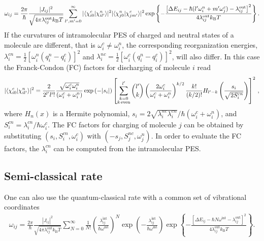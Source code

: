 \begin{align}
 \omega_{ij}= \frac{2\pi}{\hbar}  \frac{|J_{ij}|^2}{\sqrt{4\pi 
\lambda_{ij}^\text{out} k_\text{B}T}}
 \sum_{l',m'=0}^\infty
 |\langle \chi_{i0}^c |\chi_{il'}^n \rangle|^2 
|\langle \chi_{j0}^n |\chi_{jm'}^c \rangle|^2
\exp
\left\{ -\frac{ \left[ \Delta E_{ij}-\hbar(l'\omega_i^n+m'\omega_j^c) 
-\lambda_{ij}^\text{out} \right]^2}{4\lambda_{ij}^\text{out} k_\text{B}T}
\right\} .
\label{equ:jjortner}
\end{align}
If the curvatures of intramolecular PES of charged and neutral states of a 
molecule are different, that is $\omega_i^c\neq\omega_i^n$, the corresponding 
reorganization energies, $\lambda_i^{cn}=\frac{1}{2}[\omega_i^n(q_i^n-q_i^c)]^2$ 
and $\lambda_i^{nc}=\frac{1}{2}[\omega_i^c(q_i^n-q_i^c)]^2$, will also differ. 
In this case the Franck-Condon (FC) factors for discharging of molecule $i$ read 
\cite{chang_new_2005}
\begin{align}
|\langle \chi_{i0}^c |\chi_{il'}^n \rangle|^2 =
\frac{2}{2^{l'}l'!} \frac{\sqrt{\omega_i^c\omega_i^n}}{(\omega_i^c+\omega_i^n)} 
\exp\left( -|s_i| \right)
 \left[ \sum_{\substack{k=0\\k\,\text{even}}}^{l'} {l' \choose k}
\left( \frac{2 \omega_i^c }{\omega_i^c+\omega_i^n}\right)^{k/2} 
\frac{k!}{(k/2)!}
H_{l'-k} \left( \frac{s_{i}}{\sqrt{2S^{cn}_i}}\right)
\right]^2
\, ,
\end{align}
where $H_n(x)$ is a Hermite polynomial, 
$s_i=2\sqrt{\lambda_i^{nc}\lambda_i^{cn}} / \hbar(\omega_i^c+\omega_i^n)$, and 
$S^{cn}_i=\lambda_i^{cn}/\hbar\omega_i^c$. The FC factors for charging of 
molecule $j$ can be obtained by substituting $(s_i,S^{cn}_i,\omega_i^c)$ with 
$(-s_j,S^{nc}_j, \omega_j^n)$. In order to evaluate the FC factors, the 
 $\lambda_i^{cn}$ can 
be computed from the intramolecular PES.

\subsection{Semi-classical rate}
\label{sec:rate_semiclassical}

One can also use the quantum-classical rate with a common set of vibrational 
coordinates~\cite{may_relationship_2011}
\begin{align}
 \omega_{ij} = \frac{2\pi}{\hbar}  \frac{|J_{ij}|^2}{\sqrt{4\pi 
\lambda_{ij}^\text{out} k_\text{B}T}}
 \sum_{N=0}^\infty \frac{1}{N!} \left( 
\frac{\lambda_{ij}^\text{int}}{\hbar\omega^\text{int}} \right)^{N}
  \exp \left( - \frac{\lambda_{ij}^\text{int}}{\hbar\omega^\text{int}}\right)
\exp
\left\{ -\frac{ \left[ \Delta E_{ij}-\hbar N\omega^\text{int} 
-\lambda_{ij}^\text{out} \right]^2}{4\lambda_{ij}^\text{out} k_\text{B}T}
\right\} .
\label{equ:jortner}
\end{align}

